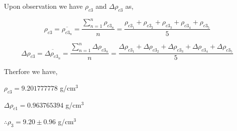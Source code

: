 {Upon observation we have $\rho_{c3}$ and $\Delta \rho_{c3}$ as,}

	$$\rho_{c3} = \overline{\rho_{c3_n}} = \frac{\sum_{n=1}^{n}\rho_{c3_n}}{n} = \frac{\rho_{c3_1} + \rho_{c3_2} + \rho_{c3_3} + \rho_{c3_4} + \rho_{c3_5}}{5}$$

	$$\Delta \rho_{c3} = \overline{\Delta \rho_{c3_n}} = \frac{\sum_{n=1}^{n}\Delta \rho_{c3_n}}{n} = \frac{\Delta \rho_{c3_1} + \Delta \rho_{c3_2} + \Delta \rho_{c3_3} + \Delta \rho_{c3_4} + \Delta \rho_{c3_5}}{5}$$

{Therfore we have,}

{$\rho_{c3} = 9.201777778$ g/cm$^3$}

{$\Delta \rho_{c1} = 0.963765394$ g/cm$^3$}

{$\therefore \rho_{3} = 9.20 \pm 0.96$ g/cm$^3$}


